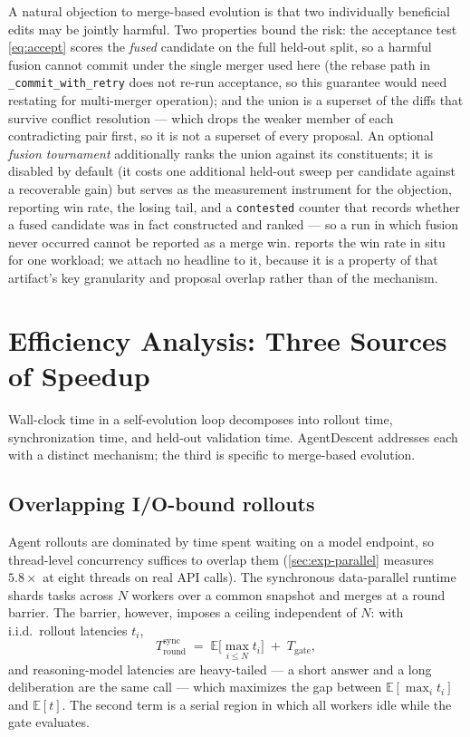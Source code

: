 \documentclass{article}
\newcommand{\code}[1]{\texttt{#1}}
\begin{document}
A natural objection to merge-based evolution is that two individually beneficial edits may be jointly harmful. Two properties bound the risk: the acceptance test \cref{eq:accept} scores the \emph{fused} candidate on the full held-out split, so a harmful fusion cannot commit under the single merger used here (the rebase path in \code{\_commit\_with\_retry} does not re-run acceptance, so this guarantee would need restating for multi-merger operation); and the union is a superset of the diffs that survive conflict resolution --- which drops the weaker member of each contradicting pair first, so it is not a superset of every proposal. An optional \emph{fusion tournament} additionally ranks the union against its constituents; it is disabled by default (it costs one additional held-out sweep per candidate against a recoverable gain) but serves as the measurement instrument for the objection, reporting win rate, the losing tail, and a \code{contested} counter that records whether a fused candidate was in fact constructed and ranked --- so a run in which fusion never occurred cannot be reported as a merge win.  reports the win rate in situ for one workload; we attach no headline to it, because it is a property of that artifact's key granularity and proposal overlap rather than of the mechanism.

\section{Efficiency Analysis: Three Sources of Speedup}
\label{sec:efficiency}

Wall-clock time in a self-evolution loop decomposes into rollout time, synchronization time, and held-out validation time. AgentDescent addresses each with a distinct mechanism; the third is specific to merge-based evolution.

\subsection{Overlapping I/O-bound rollouts}
\label{sec:concept-parallel}
Agent rollouts are dominated by time spent waiting on a model endpoint, so thread-level concurrency suffices to overlap them (\cref{sec:exp-parallel} measures $5.8\times$ at eight threads on real API calls). The synchronous data-parallel runtime shards tasks across $N$ workers over a common snapshot and merges at a round barrier. The barrier, however, imposes a ceiling independent of $N$: with i.i.d.\ rollout latencies $t_i$,
\begin{equation}
\label{eq:barrier}
T_{\mathrm{round}}^{\mathrm{sync}} \;=\; \mathbb{E}\bigl[\max_{i \le N} t_i\bigr] \;+\; T_{\mathrm{gate}},
\end{equation}
and reasoning-model latencies are heavy-tailed --- a short answer and a long deliberation are the same call --- which maximizes the gap between $\mathbb{E}[\max_i t_i]$ and $\mathbb{E}[t]$. The second term is a serial region in which all workers idle while the gate evaluates.
\end{document}
